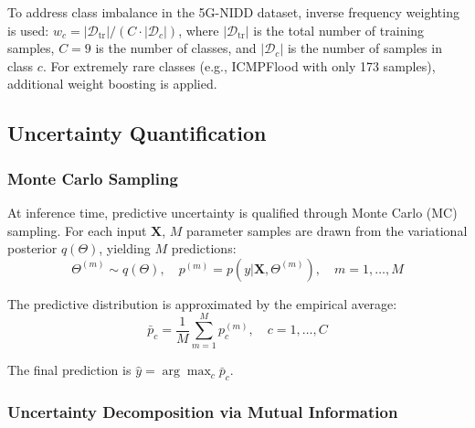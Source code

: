 \documentclass[lettersize,journal]{IEEEtran}
\begin{document}
To address class imbalance in the 5G-NIDD dataset, inverse frequency weighting is used: $w_c = |\mathcal{D}_{\text{tr}}| / (C \cdot |\mathcal{D}_c|)$, where $|\mathcal{D}_{\text{tr}}|$ is the total number of training samples, $C=9$ is the number of classes, and $|\mathcal{D}_c|$ is the number of samples in class $c$. For extremely rare classes (e.g., ICMPFlood with only 173 samples), additional weight boosting is applied.

\subsection{Uncertainty Quantification}
\label{sec:uncertainty}

\subsubsection{Monte Carlo Sampling}

At inference time, predictive uncertainty is qualified through Monte Carlo (MC) sampling. For each input $\mathbf{X}$, $M$ parameter samples are drawn from the variational posterior $q(\Theta)$, yielding $M$ predictions:
\begin{equation}
\Theta^{(m)} \sim q(\Theta), \quad p^{(m)} = p(y|\mathbf{X}, \Theta^{(m)}), \quad m=1,\ldots,M
\end{equation}

The predictive distribution is approximated by the empirical average:
\begin{equation}
\bar{p}_c = \frac{1}{M} \sum_{m=1}^M p_c^{(m)}, \quad c=1,\ldots,C
\end{equation}

The final prediction is $\hat{y} = \arg\max_c \bar{p}_c$.

\subsubsection{Uncertainty Decomposition via Mutual Information}
\end{document}
